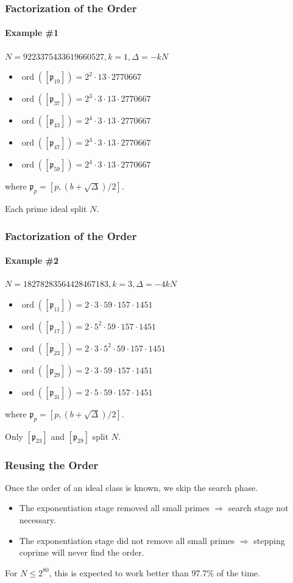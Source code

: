 \documentclass{beamer}
\DeclareMathOperator{\ord}{ord}
\newcommand{\ideal}{\mathfrak}
\newcommand{\idealclass}[1]{\left[ \ideal #1 \right]}
\begin{document}
\begin{frame}
\frametitle{Factorization of the Order}
\framesubtitle{Example \#1}

$N = 9223375433619660527, k = 1, \Delta = -kN$
\begin{itemize}
\item $\ord(\idealclass{p_{19}}) = 2^2 \cdot 13 \cdot 2770667$
\item $\ord(\idealclass{p_{37}}) = 2^3 \cdot 3 \cdot 13 \cdot 2770667$
\item $\ord(\idealclass{p_{43}}) = 2^4 \cdot 3 \cdot 13 \cdot 2770667$
\item $\ord(\idealclass{p_{47}}) = 2^3 \cdot 3 \cdot 13 \cdot 2770667$
\item $\ord(\idealclass{p_{59}}) = 2^4 \cdot 3 \cdot 13 \cdot 2770667$
\end{itemize}

where $\ideal p_p = [p, (b + \sqrt\Delta)/2]$.

\bigskip
Each prime ideal split $N$.
\end{frame}

\begin{frame}
\frametitle{Factorization of the Order}
\framesubtitle{Example \#2}

$N = 18278283564428467183, k = 3, \Delta = -4kN$
\begin{itemize}
\item $\ord(\idealclass{p_{11}}) = 2 \cdot 3 \cdot 59 \cdot 157 \cdot 1451$
\item $\ord(\idealclass{p_{17}}) = 2 \cdot 5^2 \cdot 59 \cdot 157 \cdot 1451$
\item $\ord(\idealclass{p_{23}}) = 2 \cdot 3 \cdot 5^2 \cdot 59 \cdot 157 \cdot 1451$
\item $\ord(\idealclass{p_{29}}) = 2 \cdot 3 \cdot 59 \cdot 157 \cdot 1451$
\item $\ord(\idealclass{p_{31}}) = 2 \cdot 5 \cdot 59 \cdot 157 \cdot 1451$
\end{itemize}

where $\ideal p_p = [p, (b + \sqrt\Delta)/2]$.

\bigskip
Only $\idealclass{p_{23}}$ and $\idealclass{p_{29}}$ split $N$.

\end{frame}

\begin{frame}
\frametitle{Reusing the Order}
Once the order of an ideal class is known, we skip the search phase.
\begin{itemize}
\item The exponentiation stage removed all small primes $\Rightarrow$ search stage not necessary.
\item The exponentiation stage did not remove all small primes $\Rightarrow$ stepping coprime will never find the order.
\end{itemize}
For $N \le 2^{80}$, this is expected to work better than 97.7\% of the time.
\end{frame}
\end{document}
